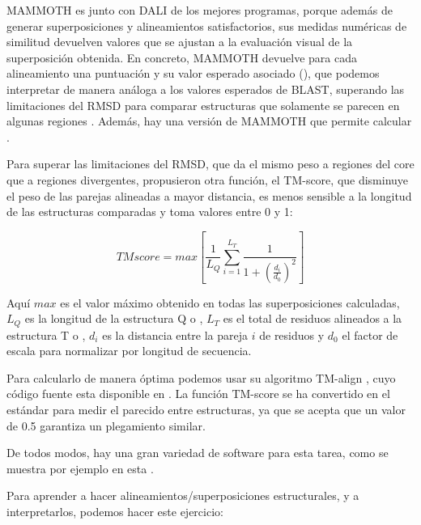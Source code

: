 MAMMOTH es junto con DALI de los mejores programas, porque adem\'{a}s de generar superposiciones y alineamientos satisfactorios, 
sus medidas num\'{e}ricas de similitud devuelven valores que se ajustan a la evaluaci\'{o}n visual de la superposici\'{o}n obtenida.
En concreto, MAMMOTH devuelve para cada alineamiento una puntuaci\'{o}n y su valor esperado asociado (),
que podemos interpretar de manera an\'{a}loga a los valores esperados de BLAST, superando las limitaciones del RMSD para 
comparar estructuras que solamente se parecen en algunas regiones \citep{Siew2000}. 
Adem\'{a}s, hay una versi\'{o}n de MAMMOTH que permite calcular 
.

Para superar las limitaciones del RMSD, que da el mismo peso a regiones del core que a regiones divergentes, 
\citet{Zhang2004} propusieron otra funci\'{o}n, el TM-score, que disminuye el peso de las parejas alineadas a mayor distancia, es menos sensible
a la longitud de las estructuras comparadas y toma valores entre 0 y 1: 

\begin{equation}
TMscore = max[  \frac{1}{L_{Q}}  \sum_{i=1}^{L_{T}} \frac{1}{ 1 + (\frac{d_{i}}{d_{0}})^{2} } ]
\end{equation} 

Aqu\'{i} $max$ es el valor m\'{a}ximo obtenido en todas las superposiciones calculadas, 
$L_{Q}$ es la longitud de la estructura Q o , 
$L_{T}$ es el total de residuos alineados a la estructura T o , 
$d_{i}$ es la distancia entre la pareja $i$ de residuos y 
$d_{0}$ el factor de escala para normalizar por longitud de secuencia. 

Para calcularlo de manera \'{o}ptima podemos usar su algoritmo TM-align \citep{Zhang2005}, cuyo c\'{o}digo fuente esta disponible en 
. La funci\'{o}n TM-score
se ha convertido en el est\'{a}ndar para medir el parecido entre estructuras, ya que se acepta que un valor de 0.5 garantiza un plegamiento similar.

De todos modos, hay una gran variedad de software para esta tarea, 
como se muestra por ejemplo en esta .

Para aprender a hacer alineamientos/superposiciones estructurales, y a interpretarlos, podemos hacer este ejercicio:

